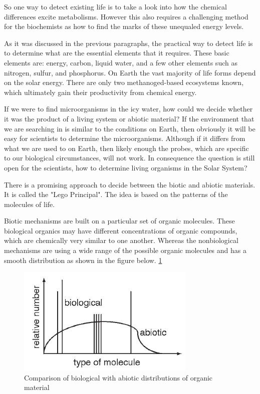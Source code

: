 So one way to detect existing life is to take a look into how the chemical differences excite metabolisms. However this also requires a challenging method for the biochemists as how to find the marks of these unequaled energy levels.

As it was discussed in the previous paragraphs, the practical way to detect life is to determine what are the essential elements that it requires. These basic elements are: energy, carbon, liquid water, and a few other elements such as nitrogen, sulfur, and phosphorus.
On Earth the vast majority of life forms depend on the solar energy. There are only two methanoged-based ecosystems known, which ultimately gain their productivity from chemical energy.
\cite{10.1371/journal.pbio.0020302}


If we were to find microorganisms in the icy water, how could we decide whether it was the product of a living system or abiotic material? If the environment that we are searching in is similar to the conditions on Earth, then obviously it will be easy for scientists to determine the microorganisms. Although if it differs from what we are used to on Earth, then likely enough the probes, which are specific to our biological circumstances, will not work. In consequence the question is still open for the scientists, how to determine living organisms in the Solar System?

There is a promising approach to decide between the biotic and abiotic materials. It is called the "Lego Principal". The idea is based on the patterns of the molecules of life.

Biotic mechanisms are built on a particular set of organic molecules. These biological organics may have different concentrations of organic compounds, which are chemically very similar to one another. 
Whereas the nonbiological mechanisms are using a wide range of the possible organic molecules and has a smooth distribution as shown in the figure below.
\ref{fig:biological_vs_abiotic}

\begin{figure}[htb]
  \centering
  \includegraphics[scale=.9]{figures/BFfig/biological_vs_abiotic}
  \caption{Comparison of biological with abiotic distributions of organic material}
  \label{fig:biological_vs_abiotic}
\end{figure}

